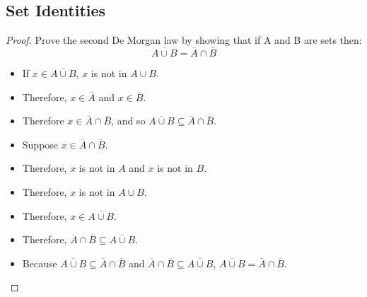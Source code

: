 \subsection{Set Identities}
\begin{proof}
    Prove the second De Morgan law by showing that if A and B are sets then:
    \begin{equation*}
        \overline{A \cup B} = \overline{A} \cap \overline{B}
    \end{equation*}
    \begin{itemize}
        \item If \(x \in \overline{A \cup B}\), \(x\) is not in \(A \cup B\).
        \item Therefore, \(x \in \overline{A}\) and \(x \in \overline{B}\).
        \item Therefore \(x \in \overline{A} \cap \overline{B}\), and so \(\overline{A \cup B} \subseteq \overline{A} \cap \overline{B}\).
        \item Suppose \(x \in \overline{A} \cap \overline{B}\).
        \item Therefore, \(x\) is not in \(A\) and \(x\) is not in \(B\).
        \item Therefore, \(x\) is not in \(A \cup B\).
        \item Therefore, \(x \in \overline{A \cup B}\).
        \item Therefore, \(\overline{A} \cap \overline{B} \subseteq \overline{A \cup B}\).
        \item Because \(\overline{A \cup B} \subseteq \overline{A} \cap \overline{B}\) and \(\overline{A} \cap \overline{B} \subseteq \overline{A \cup B}\), \(\overline{A \cup B} = \overline{A} \cap \overline{B}\).
    \end{itemize}
\end{proof}


